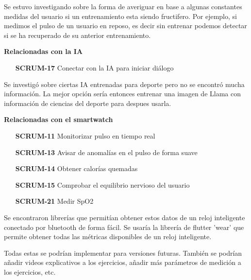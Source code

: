 \hspace{0.5cm}

Se estuvo investigando sobre la forma de averiguar en base a algunas constantes medidas del usuario si un entrenamiento esta siendo fructifero. Por ejemplo, si medimos el pulso de un usuario en reposo, es decir sin entrenar podemos detectar si se ha recuperado de su anterior entrenamiento.

\hspace{0.5cm}

\textbf{Relacionadas con la IA}
\begin{itemize}
		\item[\textbf{SCRUM-17}] Conectar con la IA para iniciar diálogo
\end{itemize}

\hspace{0.5cm}

Se investigó sobre ciertas IA entrenadas para deporte pero no se encontró mucha información. La mejor opción sería entonces entrenar una imagen de Llama con información de ciencias del deporte para despues usarla. 

\hspace{0.5cm}

\textbf{Relacionadas con el smartwatch}
\begin{itemize}
  	\item[\textbf{SCRUM-11}] Monitorizar pulso en tiempo real
	\item[\textbf{SCRUM-13}] Avisar de anomalías en el pulso de forma suave
	\item[\textbf{SCRUM-14}] Obtener calorías quemadas
	\item[\textbf{SCRUM-15}] Comprobar el equilibrio nervioso del usuario
	\item[\textbf{SCRUM-21}] Medir SpO2
\end{itemize}

\hspace{0.5cm}

Se encontraron librerías que permitían obtener estos datos de un reloj inteligente conectado por bluetooth de forma fácil. Se usaría la librería de flutter 'wear' que permite obtener todas las métricas disponibles de un reloj inteligente.

Todas estas se podrían implementar para versiones futuras. También se podrían añadir videos explicativos a los ejercicios, añadir más parámetros de medición a los ejercicios, etc.